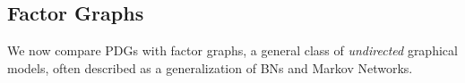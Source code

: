 \documentclass{article}
\numberwithin{equation}{section}
\begin{document}
	
	\subsection{Factor Graphs} \label{sec:factor-graphs}


	
	
	We now compare PDGs with factor graphs, a general class of \emph{undirected} graphical models, often described as a generalization of BNs and Markov Networks.
	
\end{document}
